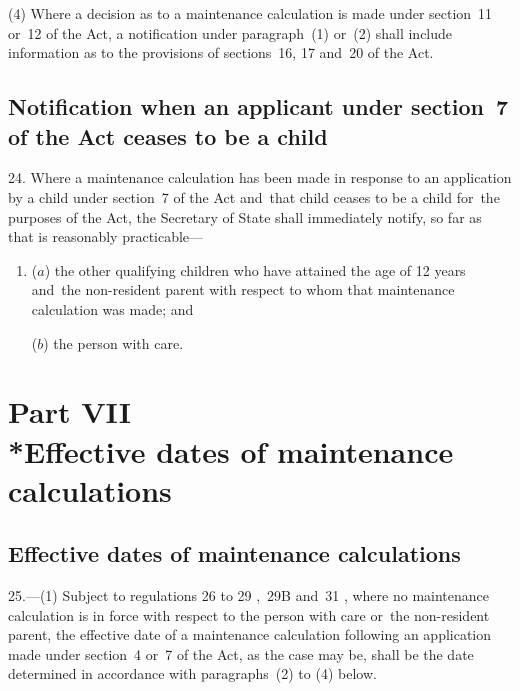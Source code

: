 \documentclass[12pt,a4paper]{article}
\begin{document}
(4) Where a decision as to a maintenance calculation is made under section~11 or~12 of the Act, a notification under paragraph~(1) or~(2) shall include information as to the provisions of sections~16, 17 and~20 of the Act.

\subsection[24. Notification when an applicant under section~7 of the Act ceases to be a child]{Notification when an applicant under section~7 of the Act ceases to be a child}

24.  Where a maintenance calculation has been made in response to an application by a child under section~7 of the Act and~that child ceases to be a child for~the purposes of the Act, the Secretary of State shall immediately notify, so far as that is reasonably practicable—
\begin{enumerate}\item[]
($a$) the other qualifying children who have attained the age of 12 years and~the non-resident parent with respect to whom that maintenance calculation was made; and

($b$) the person with care.
\end{enumerate}

\section[Part VII --- Effective dates of maintenance calculations]{Part VII\\*Effective dates of maintenance calculations}

\renewcommand\parthead{--- Part VII}

\subsection[25. Effective dates of maintenance calculations]{Effective dates of maintenance calculations}

25.---(1)  Subject to regulations 26 to 29%
,~29B  %
and~31%
, where no maintenance calculation is in force with respect to the person with care or~the non-resident parent, the effective date of a maintenance calculation following an application made under section~4 or~7 of the Act, 
as the case may be, shall be the date determined in accordance with paragraphs~(2) to (4) below.
\end{document}
